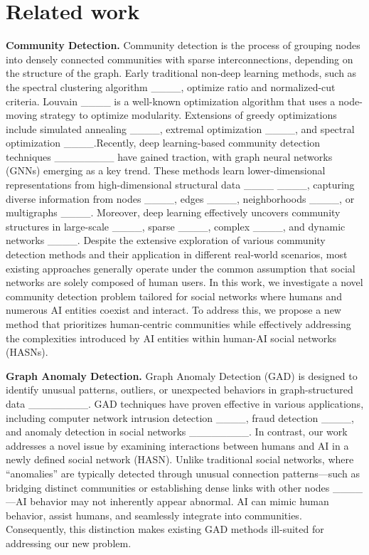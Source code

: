 \section{Related work}
\label{sec:related_work}

\noindent\textbf{Community Detection.} Community detection is the process of grouping nodes into densely connected communities with sparse interconnections, depending on the structure of the graph. Early traditional non-deep learning methods, such as the spectral clustering algorithm ____, optimize ratio and normalized-cut criteria. Louvain ____ is a well-known optimization algorithm that uses a node-moving strategy to optimize modularity. Extensions of greedy optimizations include simulated annealing ____, extremal optimization ____, and spectral optimization ____.Recently, deep learning-based community detection techniques ________ have gained traction, with graph neural networks (GNNs) emerging as a key trend. These methods learn lower-dimensional representations from high-dimensional structural data ____ ____, capturing diverse information from nodes ____, edges ____, neighborhoods ____, or multigraphs ____. Moreover, deep learning effectively uncovers community structures in large-scale ____, sparse ____, complex ____, and dynamic networks ____. Despite the extensive exploration of various community detection methods and their application in different real-world scenarios, most existing approaches generally operate under the common assumption that social networks are solely composed of human users. In this work, we investigate a novel community detection problem tailored for social networks where humans and numerous AI entities coexist and interact. To address this, we propose a new method that prioritizes human-centric communities while effectively addressing the complexities introduced by AI entities within human-AI social networks (HASNs).

\noindent\textbf{Graph Anomaly Detection.} Graph Anomaly Detection (GAD) is designed to identify unusual patterns, outliers, or unexpected behaviors in graph-structured data ________. GAD techniques have proven effective in various applications, including computer network intrusion detection ____, fraud detection ____, and anomaly detection in social networks ________. In contrast, our work addresses a novel issue by examining interactions between humans and AI in a newly defined social network (HASN). Unlike traditional social networks, where “anomalies” are typically detected through unusual connection patterns—such as bridging distinct communities or establishing dense links with other nodes ____—AI behavior may not inherently appear abnormal. AI can mimic human behavior, assist humans, and seamlessly integrate into communities. Consequently, this distinction makes existing GAD methods ill-suited for addressing our new problem.

